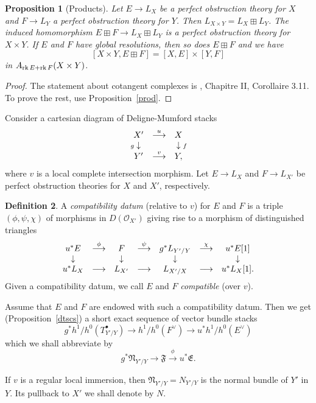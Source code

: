 \documentclass[11pt]{article}
\theoremstyle{plain}
\newtheorem{prop}{Proposition}[section]
\theoremstyle{definition}
\newtheorem{defnp}[prop]{Definition}
\newenvironment{defn}{\begin{defnp}\normalfont}{\end{defnp}}
\newenvironment{pf}{\begin{proof}}{\end{proof}}
\newcommand{\dual}[1]{{{#1}^{\vee}}}
\newcommand{\upst}{^{\ast}}
\newcommand{\com}{^{\scriptscriptstyle\bullet}}
\newcommand{\EE}{{\mathfrak{E}}}
\newcommand{\FF}{{\mathfrak{F}}}
\newcommand{\NN}{{\mathfrak{N}}}
\renewcommand{\O}{{\mathcal{O}}}
\newcommand{\rk}{\mathop{\rm rk}}
\newcommand{\ldiag}[1]
       {\makebox[0cm]{\({\scriptstyle#1}\downarrow\phantom{\scriptstyle#1}\)}}
\newcommand{\rdiag}[1]
       {\makebox[0cm]{\(\phantom{\scriptstyle#1}\downarrow{\scriptstyle#1}\)}}
\newcommand{\comdia}[9]{
\begin{array}{ccc}
#1 & \stackrel{#2}{\longrightarrow} & #3 \\
\ldiag{#4} & #5 & \rdiag{#6} \\
#7 & \stackrel{#8}{\longrightarrow} & #9
\end{array}}
\theoremstyle{plain}
\theoremstyle{definition}
\theoremstyle{remark}
\begin{document}
\begin{prop}[Products]
Let \(E\to L_X\) be a perfect obstruction theory for \(X\) and \(F\to L_Y\)
a perfect obstruction theory for \(Y\). Then \(L_{X\times Y}=L_X\boxplus
L_Y\). The induced homomorphism \(E\boxplus F\to L_X\boxplus L_Y\) is a
perfect obstruction theory for \(X\times Y\). If \(E\) and \(F\) have global
resolutions, then so does \(E\boxplus F\) and we have
\[
[X\times Y,E\boxplus F]=[X,E]\times[Y,F]
\]
in \(A_{\rk E+\rk F}(X\times Y)\).
\end{prop}
\begin{pf}
The statement about cotangent complexes is \cite{Ill}, Chapitre II, Corollaire
3.11.
To prove the rest, use Proposition~\ref{prod}.
\end{pf}

Consider a cartesian diagram of Deligne-Mumford stacks
\begin{equation}\label{asd}
\comdia{X'}{u}{X}{g}{}{f}{Y'}{v}{Y,}
\end{equation}
where \(v\) is a local complete intersection morphism.
Let \(E\to L_X\) and \(F\to L_{X'}\) be perfect obstruction theories for
\(X\) and \(X'\), respectively.

\begin{defn} A {\em compatibility datum }(relative to \(v\)) for \(E\) and
\(F\) is a triple
\((\phi,\psi,\chi)\) of morphisms in \(D(\O_{X'})\) giving rise to a
morphism of distinguished triangles
\[
\begin{array}{ccccccc}
u\upst E & \stackrel{\phi}{\longrightarrow} & F &
\stackrel{\psi}{\longrightarrow} & g\upst L_{Y'/Y} &
\stackrel{\chi}{\longrightarrow} & u\upst E[1] \\
\ldiag{} & &  \ldiag{} & & \ldiag{} & & \rdiag{} \\
u\upst L_X & {\longrightarrow} & L_{X'} &
{\longrightarrow} & L_{X'/X} &
{\longrightarrow} & u\upst L_X[1] .
\end{array}
\]
Given a compatibility datum, we call \(E\) and \(F\) {\em compatible
}(over \(v\)).
\end{defn}

Assume that \(E\) and \(F\) are endowed with such a compatibility datum.
Then we get (Proposition~\ref{dtscs}) a short exact sequence of vector
bundle stacks
\[
g\upst h^1/h^0(T_{Y'/Y}\com)\longrightarrow
h^1/h^0(\dual{F})\longrightarrow u\upst h^1/h^0(\dual{E})
\]
which we shall abbreviate by
\[
g\upst\NN_{Y'/Y} \longrightarrow\FF\stackrel{\phi}{\longrightarrow}
u\upst\EE.
\]

If \(v\) is a regular local immersion, then \(\NN_{Y'/Y}=N_{Y'/Y}\) is the
normal bundle of \(Y'\) in \(Y\). Its pullback to \(X'\) we shall denote by
\(N\).
\end{document}
